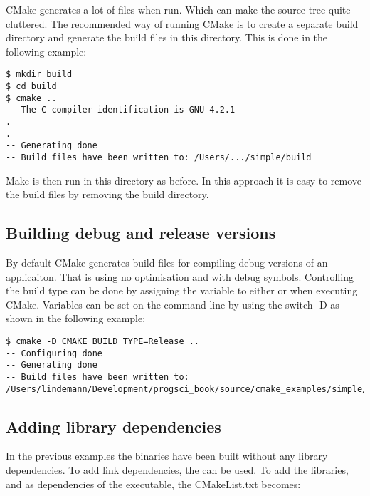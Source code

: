 CMake generates a lot of files when run. Which can make the source tree quite cluttered. The recommended way of running CMake is to create a separate build directory and generate the build files in this directory. This is done in the following example:

\begin{lstlisting}
$ mkdir build
$ cd build
$ cmake ..
-- The C compiler identification is GNU 4.2.1
.
.
-- Generating done
-- Build files have been written to: /Users/.../simple/build
\end{lstlisting}

Make is then run in this directory as before. In this approach it is easy to remove the build files by removing the build directory.

\subsection{Building debug and release versions}

By default CMake generates build files for compiling debug versions of an applicaiton. That is using no optimisation and with debug symbols. Controlling the build type can be done by assigning the variable  to either  or  when executing CMake. Variables can be set on the command line by using the switch -D as shown in the following example:

\begin{lstlisting}
$ cmake -D CMAKE_BUILD_TYPE=Release ..
-- Configuring done
-- Generating done
-- Build files have been written to: /Users/lindemann/Development/progsci_book/source/cmake_examples/simple/build
\end{lstlisting}

\subsection{Adding library dependencies}

In the previous examples the binaries have been built without any library dependencies. To add link dependencies, the  can be used. To add the libraries,  and  as dependencies of the executable, the CMakeList.txt becomes:

